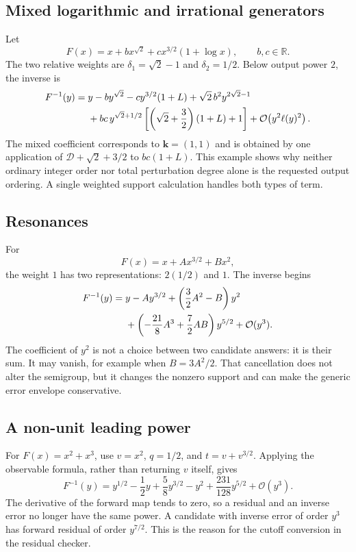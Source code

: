 \documentclass[11pt,a4paper]{article}
\numberwithin{equation}{section}
\theoremstyle{definition}
\newcommand{\R}{\mathbb R}
\newcommand{\OO}{\mathcal O}
\newcommand{\D}{\mathcal D}
\newcommand{\kk}{\boldsymbol k}
\begin{document}
\subsection{Mixed logarithmic and irrational generators}
Let
\[
 F(x)=x+b x^{\sqrt2}+c x^{3/2}(1+\log x),\qquad b,c\in\R.
\]
The two relative weights are $\delta_1=\sqrt2-1$ and
$\delta_2=1/2$. Below output power $2$, the inverse is
\begin{align}
 F^{-1}(y)={}&y-b y^{\sqrt2}-c y^{3/2}(1+L)
 +\sqrt2\,b^2y^{2\sqrt2-1}\notag\\
 &+bc\,y^{\sqrt2+1/2}
       \left[\left(\sqrt2+\frac32\right)(1+L)+1\right]
 +\OO\!\left(y^2\ell(y)^2\right).
 \label{eq:mixed-example}
\end{align}
The mixed coefficient corresponds to $\kk=(1,1)$ and is obtained by
one application of $\D+\sqrt2+3/2$ to $bc(1+L)$.
This example shows why neither ordinary integer order nor total
perturbation degree alone is the requested output ordering. A single
weighted support calculation handles both types of term.

\subsection{Resonances}
For
\[
 F(x)=x+A x^{3/2}+B x^2,
\]
the weight $1$ has two representations: $2(1/2)$ and $1$.
The inverse begins
\begin{align}
 F^{-1}(y)={}&y-Ay^{3/2}
 +\left(\frac32A^2-B\right)y^2\notag\\
 &+\left(-\frac{21}{8}A^3+\frac72AB\right)y^{5/2}
 +\OO(y^3).
 \label{eq:resonance-example}
\end{align}
The coefficient of $y^2$ is not a choice between two candidate answers:
it is their sum. It may vanish, for example when $B=3A^2/2$.
That cancellation does not alter the semigroup, but it changes the
nonzero support and can make the generic error envelope conservative.

\subsection{A non-unit leading power}
For $F(x)=x^2+x^3$, use $v=x^2$, $q=1/2$, and
$t=v+v^{3/2}$. Applying the observable formula, rather than returning
$v$ itself, gives
\begin{equation}\label{eq:power-core-example}
 F^{-1}(y)=y^{1/2}-\frac12y+\frac58y^{3/2}-y^2
             +\frac{231}{128}y^{5/2}+\OO(y^3).
\end{equation}
The derivative of the forward map tends to zero, so a residual and an
inverse error no longer have the same power. A candidate with inverse
error of order $y^3$ has forward residual of order $y^{7/2}$.
This is the reason for the cutoff conversion in the residual checker.
\end{document}
